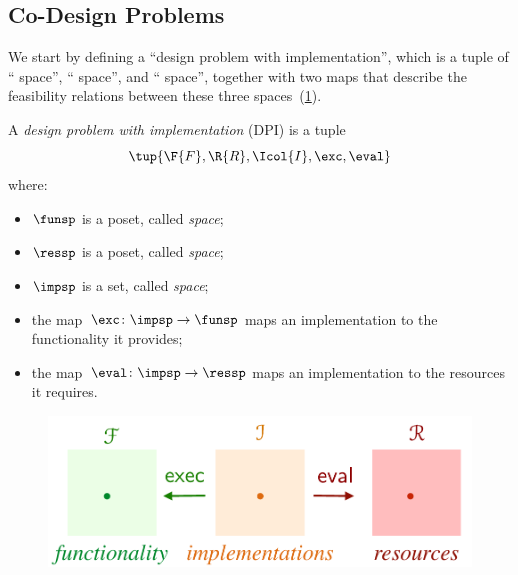 \subsection{Co-Design Problems\label{sec:Design-Problems}}

  We start by defining
a ``design problem with implementation'', which is a tuple of ``
space'', `` space'', and ``
space'', together with two maps that describe the feasibility relations
between these three spaces~(\cref{fig:setup}).
\begin{definition}
\label{def:design_problem}A \emph{design problem with implementation}
(DPI) is a tuple
\begin{equation}
  \tup{\F{F},\R{R},\Icol{I},\exc,\eval}  
\end{equation}
where:

\begin{itemize}
\item $\funsp$ is a poset, called \emph{ space};
\item $\ressp$ is a poset, called \emph{ space};
\item $\impsp$ is a set, called \emph{ space};
\item the map~$\exc\colon\impsp\rightarrow\funsp$ 
maps an implementation to the functionality it provides;
\item the map~$\eval\colon\impsp\rightarrow\ressp$
maps an implementation to the resources it requires.
\end{itemize}

\begin{figure}[h]
\begin{center}
    \includegraphics[scale=0.4]{papers/arxiv_submission_v6/gmcdp_setup.pdf}
\end{center}
\caption{\label{fig:setup}}
\end{figure}
\end{definition}


